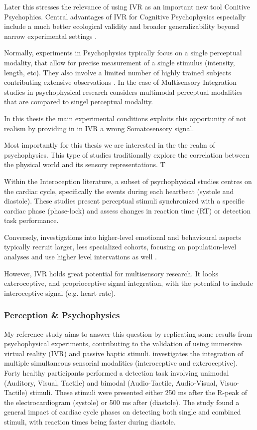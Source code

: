 \documentclass[12pt,oneside,openright]{report}
\begin{document}
Later this stresses the relevance of using IVR as an important new tool Conitive Psychophics. Central advantages of IVR for Cognitive Psychophysics especially include a much better ecological validity and broader generalizability beyond narrow experimental settings \parencite{NASTASE2020117254}.

Normally, experiments in Psychophysics typically focus on a single perceptual modality, that allow for precise measurement of a single stimulus (intensity, length, etc). They also involve a limited number of highly trained subjects contributing extensive observations \parencite{KINGDOM2012234,WASKOM2019100}. In the case of Multisensory Integration studies in psychophysical research considers multimodal perceptual modalities that are compared to singel perceptual modality. 



In this thesis the main experimental conditions exploits this opportunity of not realism by providing in in IVR a wrong Somatosensory signal. 

Most importantly for this thesis we are interested in the the realm of psychophysics. This type of studies traditionally explore the correlation between the physical world and its sensory representations. T


Within the Interoception literature, a subset of psychophysical studies centres on the cardiac cycle, specifically the events during each heartbeat (systole and diastole). These studies present perceptual stimuli synchronized with a specific cardiac phase (phase-lock) and assess changes in reaction time (RT) or detection task performance.    

Conversely, investigations into higher-level emotional and behavioural aspects typically recruit larger, less specialized cohorts, focusing on population-level analyses and use higher level intervations as well \parencite{WASKOM2019100}.

However, IVR holds great potential for multisensory research. It looks exteroceptive, and proprioceptive signal integration, with the potential to include interoceptive signal (e.g. heart rate). 



\subsubsection*{Perception \& Psychophysics}

My reference study aims to answer this question by replicating some results from psychophysical experiments, contributing to the validation of using immersive virtual reality (IVR) and passive haptic stimuli. \textcite{SALTAFOSSI2023108642} investigates the integration of multiple simultaneous sensorial modalities (interoceptive and exteroceptive). Forty healthy participants performed a detection task involving unimodal (Auditory, Visual, Tactile) and bimodal (Audio-Tactile, Audio-Visual, Visuo-Tactile) stimuli. These stimuli were presented either 250 ms after the R-peak of the electrocardiogram (systole) or 500 ms after (diastole). The study found a general impact of cardiac cycle phases on detecting both single and combined stimuli, with reaction times being faster during diastole.
\end{document}
